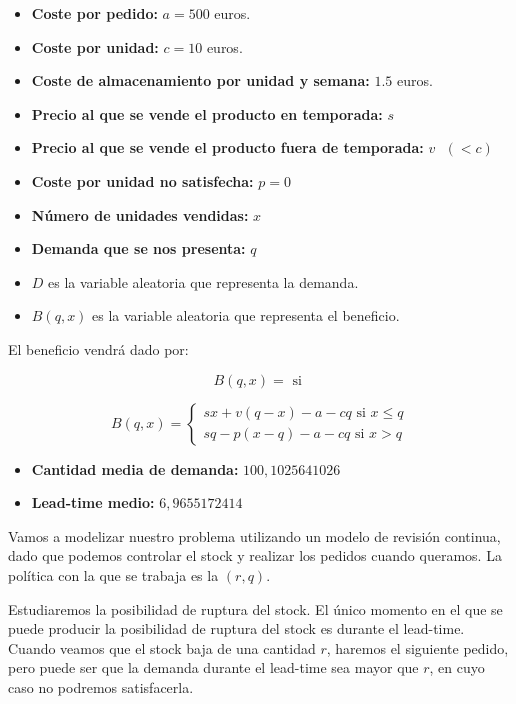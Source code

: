\documentclass[a4paper,12pt]{article}
\begin{document}
\begin{itemize}
\item[] \textbf{Coste por pedido:} $a = 500$ euros.
\item[] \textbf{Coste por unidad:} $c = 10$ euros.
\item[] \textbf{Coste de almacenamiento por unidad y semana:} $1.5$ euros.

\item[] \textbf{Precio al que se vende el producto en temporada:} $s $
\item[] \textbf{Precio al que se vende el producto fuera de temporada:} $v\text{ }(< c) $
\item[] \textbf{Coste por unidad no satisfecha:} $p = 0$


\item[] \textbf{N\'umero de unidades vendidas:} $x$
\item[] \textbf{Demanda que se nos presenta:} $q$

\item[] $D$ es la variable aleatoria que representa la demanda.
\item[] $B(q,x)$ es la variable aleatoria que representa el beneficio.
\end{itemize}

El beneficio vendr\'a dado por:

$$ B(q,x) = \text{ si }$$

	\begin{equation*}
	B(q,x) = \left\lbrace \begin{array}{l}
		sx + v(q - x) - a - cq \text{ si } x\leq q \\
		sq - p(x - q) - a - cq \text{ si } x > q
	\end{array}
	\right. 
	\end{equation*}
	

\begin{itemize}
\item[] \textbf{Cantidad media de demanda:} $100,1025641026$
\item[] \textbf{Lead-time medio:} $6,9655172414$

\end{itemize}


Vamos a modelizar nuestro problema utilizando un modelo de revisi\'on continua, dado que podemos controlar el stock y realizar los pedidos cuando queramos. La pol\'itica con la que se trabaja es la $(r, q)$.

Estudiaremos la posibilidad de ruptura del stock. El \'unico momento en el que se puede producir la posibilidad de ruptura del stock es durante el lead-time. Cuando veamos que el stock baja de una cantidad $r$, haremos el siguiente pedido, pero puede ser que la demanda durante el lead-time sea mayor que $r$, en cuyo caso no podremos satisfacerla. 
\end{document}

